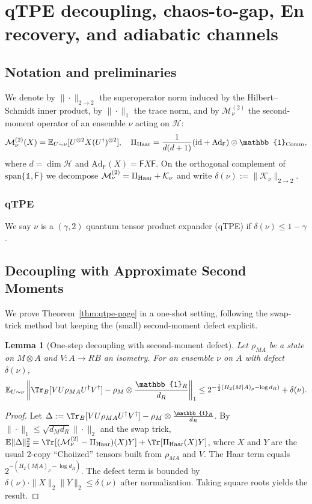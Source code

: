 \documentclass[aps,prd,preprint,onecolumn,superscriptaddress,nofootinbib,longbibliography,floatfix,11pt,showpacs,showkeys]{revtex4-2}
\theoremstyle{plain}
\newtheorem{lemma}[theorem]{Lemma}
\theoremstyle{definition}
\theoremstyle{remark}
\begin{document}
\clearpage
\section{qTPE decoupling, chaos-to-gap, En recovery, and adiabatic channels}
\label{app:qtpe}
\label{app:qtpe-decoupling}
\label{app:En-recovery}
\label{app:adiabatic-channels}
\subsection{Notation and preliminaries}
We denote by $\|\cdot\|_{2\to 2}$ the superoperator norm induced by the Hilbert--Schmidt inner product, by $\|\cdot\|_1$ the trace norm, and by $\mathcal{M}^{(2)}_\nu$ the second-moment operator of an ensemble $\nu$ acting on $\mathcal{H}$:
\[
\mathcal{M}^{(2)}_\nu(X) = \mathbb{E}_{U\sim\nu}[U^{\otimes 2}X(U^\dagger)^{\otimes 2}],\quad \Pi_{\rm Haar} =\frac{1}{d(d+1)}(\text{id} + \text{Ad}_{\mathsf{F}}) \otimes \mathbb{1}_{\rm Comm},
\]
where $d = \dim \mathcal{H}$ and $\text{Ad}_{\mathsf{F}}(X) = \mathsf{F}X\mathsf{F}$. On the orthogonal complement of $\text{span}\{\mathbb{1}, \mathsf{F}\}$ we decompose $\mathcal{M}^{(2)}_\nu = \Pi_{\rm Haar} + \mathcal{K}_\nu$ and write $\delta(\nu) := \|\mathcal{K}_\nu\|_{2\to 2}$.

\subsubsection{qTPE}
We say $\nu$ is a $(\gamma, 2)$ quantum tensor product expander (qTPE) if $\delta(\nu) \le 1 - \gamma$.

\subsection{Decoupling with Approximate Second Moments}
We prove Theorem~\ref{thm:qtpe-page} in a one-shot setting, following the swap-trick method but keeping the (small) second-moment defect explicit.

\begin{lemma}[One-step decoupling with second-moment defect]
Let $\rho_{MA}$ be a state on $M \otimes A$ and $V : A\to RB$ an isometry. For an ensemble $\nu$ on $A$ with defect $\delta(\nu)$,
\[
\mathbb{E}_{U\sim\nu} \left\| \Tr_B[V U \rho_{MA} U^\dagger V^\dagger] - \rho_M \otimes \frac{\mathbb{1}_R}{d_R} \right\|_1 \le 2^{-\frac{1}{2}(H_2(M|A)_\rho - \log d_R)} + \delta(\nu).
\]
\end{lemma}
\begin{proof}
Let $\Delta := \Tr_B[V U \rho_{MA} U^\dagger V^\dagger] - \rho_M \otimes \frac{\mathbb{1}_R}{d_R}$. By $\|\cdot\|_1 \le \sqrt{d_M d_R} \|\cdot\|_2$ and the swap trick, $\mathbb{E}\|\Delta\|_2^2 = \Tr[(\mathcal{M}^{(2)}_\nu - \Pi_{\rm Haar})(X) Y] + \Tr[\Pi_{\rm Haar}(X) Y]$, where $X$ and $Y$ are the usual 2-copy ``Choiized'' tensors built from $\rho_{MA}$ and $V$. The Haar term equals $2^{-(H_2(M|A)_\rho - \log d_R)}$. The defect term is bounded by $\delta(\nu)\cdot\|X\|_2\|Y\|_2 \le \delta(\nu)$ after normalization. Taking square roots yields the result.
\end{proof}
\end{document}

